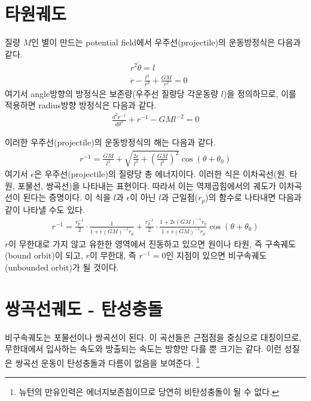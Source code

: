 \documentclass[9pt,twoside,openany]{amsbook}
\begin{document}
\section{타원궤도}
질량 $M$인 별이 만드는 potential field에서 우주선(projectile)의 운동방정식은 다음과 같다.
\begin{align}
&r^2 \dot{\theta} = l
\\&\ddot{r}-\frac{l^2}{r^3}+\frac{GM}{r^2} = 0
\end{align}
여기서 angle방향의 방정식은 보존량(우주선 질량당 각운동량 $l$)을 정의하므로, 이를 적용하면 radius방향 방정식은 다음과 같다.
\begin{align}
	\frac{d^2r^{-1}}{d\theta^2}+r^{-1}-GMl^{-2} = 0
\end{align}

이러한 우주선(projectile)의 운동방정식의 해는 다음과 같다.
\begin{align}
	r^{-1} = \frac{GM}{l^2} + \sqrt{\frac{2\epsilon}{l^2}+\left(\frac{GM}{l^2}\right)^2}\cos(\theta+\theta_0)
\end{align}
여기서 $\epsilon$은 우주선(projectile)의 질량당 총 에너지이다. 이러한 식은 이차곡선(원, 타원, 포물선, 쌍곡선)을 나타내는 표현이다. 따라서 이는 역제곱힘에서의 궤도가 이차곡선이 된다는 증명이다.
이 식을 $l$과 $\epsilon$이 아닌 $l$과 근일점($r_p$)의 함수로 나타내면 다음과 같이 나타낼 수도 있다.
\begin{align}
	r^{-1} = \frac{r_p^{-1}}{2}\cdot\frac{1}{1+\epsilon (GM)^{-1}r_p} +\frac{r_p^{-1}}{2}\cdot\frac{1+2\epsilon (GM)^{-1}r_p}{1+\epsilon (GM)^{-1}r_p}\cos(\theta+\theta_0)
\end{align}
$r$이 무한대로 가지 않고 유한한 영역에서 진동하고 있으면 원이나 타원, 즉 구속궤도(bound orbit)이 되고, $r$이 무한대, 즉 $r^{-1}=0$인 지점이 있으면 비구속궤도(unbounded orbit)가 될 것이다.

\section{쌍곡선궤도 - 탄성충돌}
비구속궤도는 포물선이나 쌍곡선이 된다. 이 곡선들은 근접점을 중심으로 대칭이므로, 무한대에서 입사하는 속도와 방출되는 속도는 방향만 다를 뿐 크기는 같다. 이런 성질은 쌍곡선 운동이 탄성충돌과 다름이 없음을 보여준다. \footnote{뉴턴의 만유인력은 에너지보존힘이므로 당연히 비탄성충돌이 될 수 없다.}
\end{document}
